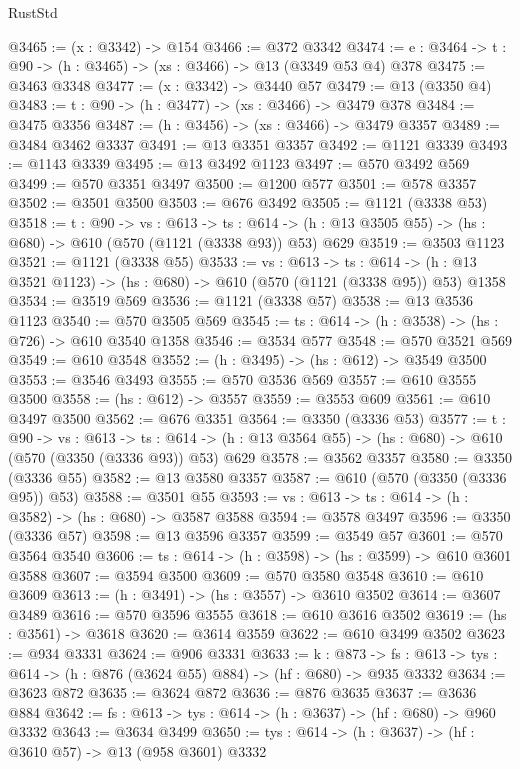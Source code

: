 \begin{lexlean}{RustStd}
\begin{coremodule}
@3465 := (x : @3342) -> @154
@3466 := @372 @3342
@3474 := {e : @3464} -> {t : @90} -> (h : @3465) -> (xs : @3466) -> @13 (@3349 @53 @4) @378
@3475 := @3463 @3348
@3477 := (x : @3342) -> @3440 @57
@3479 := @13 (@3350 @4)
@3483 := {t : @90} -> (h : @3477) -> (xs : @3466) -> @3479 @378
@3484 := @3475 @3356
@3487 := (h : @3456) -> (xs : @3466) -> @3479 @3357
@3489 := @3484 @3462 @3337
@3491 := @13 @3351 @3357
@3492 := @1121 @3339
@3493 := @1143 @3339
@3495 := @13 @3492 @1123
@3497 := @570 @3492 @569
@3499 := @570 @3351 @3497
@3500 := @1200 @577
@3501 := @578 @3357
@3502 := @3501 @3500
@3503 := @676 @3492
@3505 := @1121 (@3338 @53)
@3518 := {t : @90} ->
  {vs : @613} ->
  {ts : @614} -> (h : @13 @3505 @55) -> (hs : @680) -> @610 (@570 (@1121 (@3338 @93)) @53) @629
@3519 := @3503 @1123
@3521 := @1121 (@3338 @55)
@3533 := {vs : @613} ->
  {ts : @614} -> (h : @13 @3521 @1123) -> (hs : @680) -> @610 (@570 (@1121 (@3338 @95)) @53) @1358
@3534 := @3519 @569
@3536 := @1121 (@3338 @57)
@3538 := @13 @3536 @1123
@3540 := @570 @3505 @569
@3545 := {ts : @614} -> (h : @3538) -> (hs : @726) -> @610 @3540 @1358
@3546 := @3534 @577
@3548 := @570 @3521 @569
@3549 := @610 @3548
@3552 := (h : @3495) -> (hs : @612) -> @3549 @3500
@3553 := @3546 @3493
@3555 := @570 @3536 @569
@3557 := @610 @3555 @3500
@3558 := (hs : @612) -> @3557
@3559 := @3553 @609
@3561 := @610 @3497 @3500
@3562 := @676 @3351
@3564 := @3350 (@3336 @53)
@3577 := {t : @90} ->
  {vs : @613} ->
  {ts : @614} -> (h : @13 @3564 @55) -> (hs : @680) -> @610 (@570 (@3350 (@3336 @93)) @53) @629
@3578 := @3562 @3357
@3580 := @3350 (@3336 @55)
@3582 := @13 @3580 @3357
@3587 := @610 (@570 (@3350 (@3336 @95)) @53)
@3588 := @3501 @55
@3593 := {vs : @613} -> {ts : @614} -> (h : @3582) -> (hs : @680) -> @3587 @3588
@3594 := @3578 @3497
@3596 := @3350 (@3336 @57)
@3598 := @13 @3596 @3357
@3599 := @3549 @57
@3601 := @570 @3564 @3540
@3606 := {ts : @614} -> (h : @3598) -> (hs : @3599) -> @610 @3601 @3588
@3607 := @3594 @3500
@3609 := @570 @3580 @3548
@3610 := @610 @3609
@3613 := (h : @3491) -> (hs : @3557) -> @3610 @3502
@3614 := @3607 @3489
@3616 := @570 @3596 @3555
@3618 := @610 @3616 @3502
@3619 := (hs : @3561) -> @3618
@3620 := @3614 @3559
@3622 := @610 @3499 @3502
@3623 := @934 @3331
@3624 := @906 @3331
@3633 := {k : @873} ->
  {fs : @613} -> {tys : @614} -> (h : @876 (@3624 @55) @884) -> (hf : @680) -> @935 @3332
@3634 := @3623 @872
@3635 := @3624 @872
@3636 := @876 @3635
@3637 := @3636 @884
@3642 := {fs : @613} -> {tys : @614} -> (h : @3637) -> (hf : @680) -> @960 @3332
@3643 := @3634 @3499
@3650 := {tys : @614} -> (h : @3637) -> (hf : @3610 @57) -> @13 (@958 @3601) @3332

\end{coremodule}
\end{lexlean}
